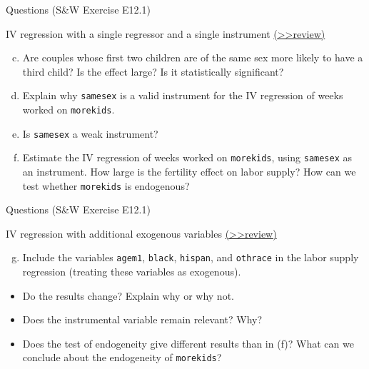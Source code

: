 \documentclass[
  10pt,
  ignorenonframetext,
]{beamer}
\providecommand{\tightlist}{%
  \setlength{\itemsep}{0pt}\setlength{\parskip}{0pt}}
\begin{document}
\begin{frame}[fragile]{Questions (S\&W Exercise E12.1)}
\protect\hypertarget{IVQ}{}
\begin{block}{IV regression with a single regressor and a single
instrument}
\protect\hypertarget{iv-regression-with-a-single-regressor-and-a-single-instrument}{}
\footnotesize\protect\hyperlink{IVCG}{(\textgreater\textgreater review)}
\normalsize

\begin{enumerate}
[(a)]
\setcounter{enumi}{2}
\item
  Are couples whose first two children are of the same sex more likely
  to have a third child? Is the effect large? Is it statistically
  significant?
\item
  Explain why \texttt{samesex} is a valid instrument for the IV
  regression of weeks worked on \texttt{morekids}.
\item
  Is \texttt{samesex} a weak instrument?
\item
  Estimate the IV regression of weeks worked on \texttt{morekids}, using
  \texttt{samesex} as an instrument. How large is the fertility effect
  on labor supply? How can we test whether \texttt{morekids} is
  endogenous?
\end{enumerate}
\end{block}
\end{frame}

\begin{frame}[fragile]{Questions (S\&W Exercise E12.1)}
\protect\hypertarget{IVCQ}{}
\begin{block}{IV regression with additional exogenous variables}
\protect\hypertarget{iv-regression-with-additional-exogenous-variables}{}
\footnotesize\protect\hyperlink{IVCCG}{(\textgreater\textgreater review)}
\normalsize

\begin{enumerate}
[(a)]
\setcounter{enumi}{6}
\tightlist
\item
  Include the variables \texttt{agem1}, \texttt{black}, \texttt{hispan},
  and \texttt{othrace} in the labor supply regression (treating these
  variables as exogenous).
\end{enumerate}

\begin{itemize}
\item
  Do the results change? Explain why or why not.
\item
  Does the instrumental variable remain relevant? Why?
\item
  Does the test of endogeneity give different results than in (f)? What
  can we conclude about the endogeneity of \texttt{morekids}?
\end{itemize}
\end{block}
\end{frame}
\end{document}
